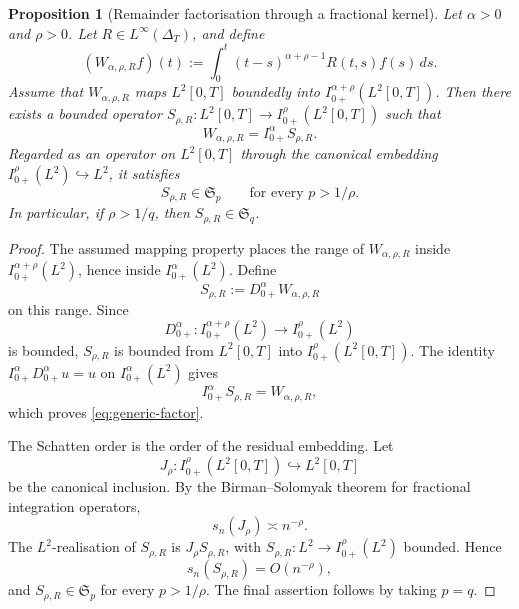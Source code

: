 \documentclass[11pt,a4paper]{amsart}
\theoremstyle{plain}
\newtheorem{proposition}[theorem]{Proposition}
\theoremstyle{definition}
\theoremstyle{remark}
\begin{document}
\begin{proposition}[Remainder factorisation through a fractional kernel]\label{prop:remainder-factor}
Let $\alpha>0$ and $\rho>0$. Let $R\in L^\infty(\Delta_T)$, and define
\[
(W_{\alpha,\rho,R}f)(t):=\int_0^t (t-s)^{\alpha+\rho-1}R(t,s)f(s)\,ds.
\]
Assume that $W_{\alpha,\rho,R}$ maps $L^2[0,T]$ boundedly into
$I_{0+}^{\alpha+\rho}(L^2[0,T])$. Then there exists a bounded operator
$S_{\rho,R}:L^2[0,T]\to I_{0+}^{\rho}(L^2[0,T])$ such that
\begin{equation}\label{eq:generic-factor}
W_{\alpha,\rho,R}=I_{0+}^{\alpha}S_{\rho,R}.
\end{equation}
Regarded as an operator on $L^2[0,T]$ through the canonical embedding
$I_{0+}^{\rho}(L^2)\hookrightarrow L^2$, it satisfies
\[
S_{\rho,R}\in\mathfrak S_p
\qquad\text{for every }p>1/\rho.
\]
In particular, if $\rho>1/q$, then $S_{\rho,R}\in\mathfrak S_q$.
\end{proposition}

\begin{proof}
The assumed mapping property places the range of $W_{\alpha,\rho,R}$ inside
$I_{0+}^{\alpha+\rho}(L^2)$, hence inside $I_{0+}^{\alpha}(L^2)$. Define
\[
S_{\rho,R}:=D_{0+}^{\alpha}W_{\alpha,\rho,R}
\]
on this range. Since
\[
D_{0+}^{\alpha}:I_{0+}^{\alpha+\rho}(L^2)\longrightarrow I_{0+}^{\rho}(L^2)
\]
is bounded, $S_{\rho,R}$ is bounded from $L^2[0,T]$ into
$I_{0+}^{\rho}(L^2[0,T])$. The identity $I_{0+}^{\alpha}D_{0+}^{\alpha}u=u$ on
$I_{0+}^{\alpha}(L^2)$ gives
\[
I_{0+}^{\alpha}S_{\rho,R}=W_{\alpha,\rho,R},
\]
which proves \eqref{eq:generic-factor}.

The Schatten order is the order of the residual embedding. Let
\[
J_\rho:I_{0+}^{\rho}(L^2[0,T])\hookrightarrow L^2[0,T]
\]
be the canonical inclusion. By the Birman--Solomyak theorem for fractional integration operators,
\[
s_n(J_\rho)\asymp n^{-\rho}.
\]
The $L^2$-realisation of $S_{\rho,R}$ is $J_\rho S_{\rho,R}$, with
$S_{\rho,R}:L^2\to I_{0+}^{\rho}(L^2)$ bounded. Hence
\[
s_n(S_{\rho,R})=O(n^{-\rho}),
\]
and $S_{\rho,R}\in\mathfrak S_p$ for every $p>1/\rho$. The final assertion follows by taking
$p=q$.
\end{proof}
\end{document}
